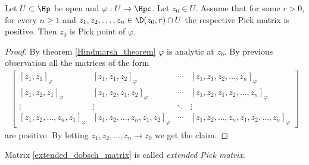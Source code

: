 \begin{lem}
	Let $U \subset \Hp$ be open and $\varphi : U \to \Hpc$. Let $z_{0} \in U$. Assume that for some $r > 0$, for every $n \geq 1$ and $z_{1}, z_{2}, \ldots, z_{n} \in \D(z_{0}, r) \cap U$ the respective Pick matrix is positive. Then $z_{0}$ is Pick point of $\varphi$.
\end{lem}
\begin{proof}
	By theorem \ref{Hindmarsh_theorem} $\varphi$ is analytic at $z_{0}$. By previous observation all the matrices of the form
\begin{align}\label{extended_dobsch_matrix}
\begin{bmatrix}
	[z_{1}, \overline{z_{1}}]_{\varphi} & [z_{1}, \overline{z_{1}}, \overline{z_{2}}]_{\varphi} & \cdots & [z_{1}, \overline{z_{1}}, \overline{z_{2}}, \ldots, \overline{z_{n}}]_{\varphi} \\
	[z_{1}, z_{2}, \overline{z_{1}}]_{\varphi} & [z_{1}, z_{2}, \overline{z_{1}}, \overline{z_{2}}]_{\varphi} & \cdots & [z_{1}, z_{2}, \overline{z_{1}}, \overline{z_{2}}, \ldots, \overline{z_{n}}]_{\varphi} \\
	\vdots & \vdots & \ddots & \vdots \\
	[z_{1}, z_{2}, \ldots, z_{n}, \overline{z_{1}}]_{\varphi} & [z_{1}, z_{2}, \ldots, z_{n}, \overline{z_{1}}, \overline{z_{2}}]_{\varphi} & \cdots &  [z_{1}, z_{2}, \ldots, z_{n}, \overline{z_{1}}, \overline{z_{2}}, \ldots, \overline{z_{n}}]_{\varphi}
\end{bmatrix}
\end{align}
are positive. By letting $z_{1}, z_{2}, \ldots, z_{n} \to z_{0}$ we get the claim.
\end{proof}
Matrix \ref{extended_dobsch_matrix} is called \textit{extended Pick matrix}.

